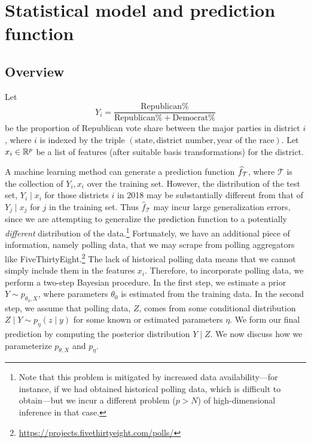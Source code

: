 \documentclass[12pt, letterpaper]{article}
\begin{document}
\section{Statistical model and prediction function}
\label{sec:model}
\subsection{Overview}
Let \[Y_i = \frac{\text{Republican}\% }{\text{Republican}\% + \text{Democrat}\%}\] be the proportion of Republican vote share between the major parties in district $i$, where $i$ is indexed by the triple $(\text{state}, \text{district number}, \text{year of the race})$.
Let $x_i\in \R^p$ be a list of features (after suitable basis transformations)
for the district. 

A machine learning method can generate a prediction function $\hat f_{\cal T}$,
where $\mathcal T$ is the collection of $Y_i, x_i$ over the training set.
However, the
distribution of the test set, $Y_i \mid x_i$ for those districts $i$ in 2018 may
be
substantially different from that of $Y_j \mid x_j$ for $j$ in the training
set. Thus $\hat f_{\mathcal T}$ may incur large generalization errors, since we
are attempting to generalize the prediction function to a potentially 
\emph{different}
distribution
of the data.\footnote{Note that this problem is mitigated by increased data
availability---for instance, if we had obtained historical polling data,
which is difficult to obtain---but we incur a different problem ($p > N$) of
high-dimensional
inference in that case.} Fortunately, we have an additional piece of
information, namely polling data, that we may scrape from polling aggregators
like
FiveThirtyEight.\footnote{\url{https://projects.fivethirtyeight.com/polls/}} The
lack of historical polling data means that we cannot simply include them in the
features $x_i$. Therefore, to incorporate polling data, we perform a two-step
Bayesian procedure. In the first step, we estimate a prior $Y \sim p_{\theta_0,
X}$, where parameters $\theta_0$ is estimated from the training data. In the
second step, we assume that polling data, $Z$, comes from some conditional
distribution $Z \mid Y \sim p_{\eta}(z\mid y)$ for some known or
estimated parameters
$\eta$. We form our final prediction by computing the posterior distribution $Y
\mid Z$. We now discuss how we parameterize $p_{\theta, X}$ and $p_\eta$.
\end{document}
